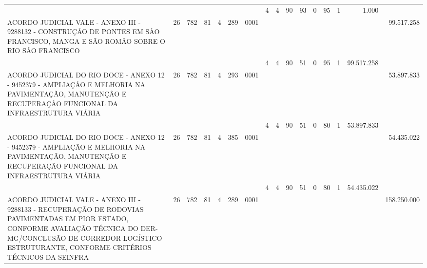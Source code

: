 \documentclass{article}
\begin{document}
\begin{longtable}[c]{m{6.5cm}|m{1pt}m{1pt}m{1pt}m{1pt}m{1pt}m{1pt}|m{1pt}m{1pt}m{0.5pt}m{1pt}|m{1pt}|m{1pt}m{1pt}|m{1pt}|m{2pt}}
& & & & & & & \multicolumn{1}{c}{ 4 } & \multicolumn{1}{c}{ 4 } & \multicolumn{1}{c}{ 90 } & \multicolumn{1}{c|}{ 93 } & \multicolumn{1}{c|}{ 0 } & \multicolumn{1}{l}{ 95 } & \multicolumn{1}{c|}{ 1 } & \multicolumn{1}{r|}{ 1.000 } & \\
\multicolumn{1}{L{5.5cm}|}{ ACORDO JUDICIAL VALE - ANEXO III - 9288132 - CONSTRUÇÃO DE PONTES EM SÃO FRANCISCO, MANGA E SÃO ROMÃO SOBRE O RIO SÃO FRANCISCO } & \multicolumn{1}{c}{ 26 } & \multicolumn{1}{c}{ 782 } & \multicolumn{1}{c}{ 81 } & \multicolumn{1}{l}{ 4 } & \multicolumn{1}{c}{ 289 } & \multicolumn{1}{l|}{ 0001 } & & & & & & & & & \multicolumn{1}{r}{ 99.517.258 } \\
& & & & & & & \multicolumn{1}{c}{ 4 } & \multicolumn{1}{c}{ 4 } & \multicolumn{1}{c}{ 90 } & \multicolumn{1}{c|}{ 51 } & \multicolumn{1}{c|}{ 0 } & \multicolumn{1}{l}{ 95 } & \multicolumn{1}{c|}{ 1 } & \multicolumn{1}{r|}{ 99.517.258 } & \\
\multicolumn{1}{L{5.5cm}|}{ ACORDO JUDICIAL DO RIO DOCE - ANEXO 12 - 9452379 - AMPLIAÇÃO E MELHORIA NA PAVIMENTAÇÃO, MANUTENÇÃO E RECUPERAÇÃO FUNCIONAL DA INFRAESTRUTURA VIÁRIA } & \multicolumn{1}{c}{ 26 } & \multicolumn{1}{c}{ 782 } & \multicolumn{1}{c}{ 81 } & \multicolumn{1}{l}{ 4 } & \multicolumn{1}{c}{ 293 } & \multicolumn{1}{l|}{ 0001 } & & & & & & & & & \multicolumn{1}{r}{ 53.897.833 } \\
& & & & & & & \multicolumn{1}{c}{ 4 } & \multicolumn{1}{c}{ 4 } & \multicolumn{1}{c}{ 90 } & \multicolumn{1}{c|}{ 51 } & \multicolumn{1}{c|}{ 0 } & \multicolumn{1}{l}{ 80 } & \multicolumn{1}{c|}{ 1 } & \multicolumn{1}{r|}{ 53.897.833 } & \\
\multicolumn{1}{L{5.5cm}|}{ ACORDO JUDICIAL DO RIO DOCE - ANEXO 12 - 9452379 - AMPLIAÇÃO E MELHORIA NA PAVIMENTAÇÃO, MANUTENÇÃO E RECUPERAÇÃO FUNCIONAL DA INFRAESTRUTURA VIÁRIA } & \multicolumn{1}{c}{ 26 } & \multicolumn{1}{c}{ 782 } & \multicolumn{1}{c}{ 81 } & \multicolumn{1}{l}{ 4 } & \multicolumn{1}{c}{ 385 } & \multicolumn{1}{l|}{ 0001 } & & & & & & & & & \multicolumn{1}{r}{ 54.435.022 } \\
& & & & & & & \multicolumn{1}{c}{ 4 } & \multicolumn{1}{c}{ 4 } & \multicolumn{1}{c}{ 90 } & \multicolumn{1}{c|}{ 51 } & \multicolumn{1}{c|}{ 0 } & \multicolumn{1}{l}{ 80 } & \multicolumn{1}{c|}{ 1 } & \multicolumn{1}{r|}{ 54.435.022 } & \\
\multicolumn{1}{L{5.5cm}|}{ ACORDO JUDICIAL VALE - ANEXO III - 9288133 - RECUPERAÇÃO DE RODOVIAS PAVIMENTADAS EM PIOR ESTADO, CONFORME AVALIAÇÃO TÉCNICA DO DER-MG/CONCLUSÃO DE CORREDOR LOGÍSTICO ESTRUTURANTE, CONFORME CRITÉRIOS TÉCNICOS DA SEINFRA } & \multicolumn{1}{c}{ 26 } & \multicolumn{1}{c}{ 782 } & \multicolumn{1}{c}{ 81 } & \multicolumn{1}{l}{ 4 } & \multicolumn{1}{c}{ 289 } & \multicolumn{1}{l|}{ 0001 } & & & & & & & & & \multicolumn{1}{r}{ 158.250.000 } \\

\end{longtable}
\end{document}
